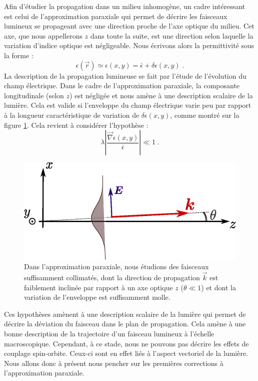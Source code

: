\documentclass[a4paper,11pt]{article} %
\begin{document}
	Afin d'étudier la propagation dans un milieu inhomogène, un cadre intéressant est celui de l'approximation paraxiale qui permet de décrire les faisceaux lumineux se propageant avec une direction proche de l'axe optique du milieu. Cet axe, que nous appellerons $ z $ dans toute la suite, est une direction selon laquelle la variation d'indice optique est négligeable. Nous écrivons alors la permittivité sous la forme :
	\begin{equation*}
		\epsilon(\vec{r}) \simeq \epsilon(x,y) = \bar{\epsilon} + \delta \epsilon(x,y) \; .
	\end{equation*}
	La description de la propagation lumineuse se fait par l'étude de l'évolution du champ électrique. Dans le cadre de l'approximation paraxiale, la composante longitudinale (selon $ z $) est négligée et nous amène à une description scalaire de la lumière. Cela est valide si l'enveloppe du champ électrique varie peu par rapport à la longueur caractéristique de variation de $\delta \epsilon (x,y)$, comme montré sur la figure \ref{fig:schema_paraxial}. Cela revient à considérer l'hypothèse : 
	\begin{equation*}
		\lambda \left| \frac{\vec{\nabla}\epsilon(x,y)}{\bar{\epsilon}} \right| \ll 1 \; .
	\end{equation*}
	
	\begin{figure}[h]
		\centering
		\begin{minipage}[c]{0.85\linewidth}
			\centering
			\includegraphics[width=0.65\linewidth]{./Illustrations/schema_paraxial}
			\caption{Dans l'approximation paraxiale, nous étudions des faisceaux suffisamment collimatés, dont la direction de propagation $ \vec{k} $ est faiblement inclinée par rapport à un axe optique $ z $ ($ \theta \ll 1 $) et dont la variation de l'enveloppe est suffisamment molle.}
			\label{fig:schema_paraxial}
		\end{minipage}
	\end{figure}
	
	Ces hypothèses amènent à une description scalaire de la lumière qui permet de décrire la déviation du faisceau dans le plan de propagation. Cela amène à une bonne description de la trajectoire d'un faisceau lumineux à l'échelle macroscopique. Cependant, à ce stade, nous ne pouvons pas décrire les effets de couplage spin-orbite. Ceux-ci sont en effet liés à l'aspect vectoriel de la lumière. Nous allons donc à présent nous pencher sur les premières corrections à l'approximation paraxiale.
	
\end{document}
